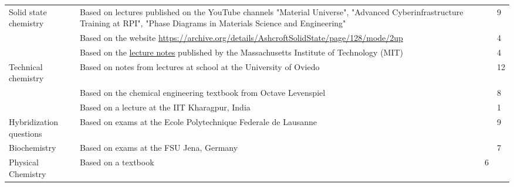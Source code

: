 \begin{xltabular}{\textwidth}{p{3.5 cm}p{6.5 cm}p{.5cm}X}
\midrule
Solid state chemistry & Based on lectures published on the YouTube channels "Material Universe", "Advanced Cyberinfrastructure Training at RPI", "Phase Diagrams in Materials Science and Engineering" && 9\\
                    & Based on the website \href{Wayback Machine}{https://archive.org/details/AshcroftSolidState/page/128/mode/2up} && 4\\
                    & Based on the \href{https://ocw.mit.edu/courses/3-091sc-introduction-to-solid-state-chemistry-fall-2010/pages/organic-materials/29-polymers-synthesis-properties-applications/}{lecture notes} published by the Massachusetts Institute of Technology (MIT) && 4\\
Technical chemistry & Based on notes from lectures at school at the University of Oviedo && 12\\
                    & Based on the chemical engineering textbook from Octave Levenspiel && 8\\
                    & Based on a lecture at the IIT Kharagpur, India && 1\\
\midrule
Hybridization questions &  Based on exams at the Ecole Polytechnique Federale de Lausanne && 9\\
\midrule
Biochemistry & Based on exams at the FSU Jena, Germany && 7\\
\midrule
Physical Chemistry & Based on a textbook & 6\\
\bottomrule
\end{xltabular}
